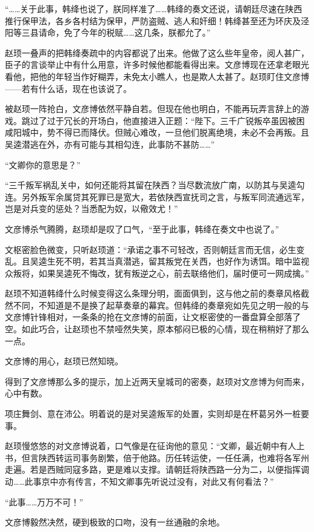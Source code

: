 “……关于此事，韩绛也说了，朕同样准了……韩绛的奏文还说，请朝廷尽速在陕西推行保甲法，各乡各村结为保甲，严防盗贼、逃人和奸细！韩绛甚至还为环庆及泾阳等三县请命，免了今年的税赋……这几条，朕都允了。”

赵顼一叠声的把韩绛奏疏中的内容都说了出来。他做了这么些年皇帝，阅人甚广，臣子的言谈举止中有什么用意，许多时候他都能看得出来。文彦博现在还拿老眼光看他，把他的年轻当作好糊弄，未免太小瞧人，也是欺人太甚了。赵顼盯住文彦博——若有什么话，现在也该说了。

被赵顼一阵抢白，文彦博依然平静自若。但现在他也明白，不能再玩弄言辞上的游戏。跳过了过于冗长的开场白，他直接进入正题：“陛下。三千广锐叛卒虽因被困咸阳城中，势不得已而降伏。但贼心难改，一旦他们脱离绝境，未必不会再叛。且吴逵潜逃在外，亦有可能与其相勾连，此事防不甚防……”

“文卿你的意思是？”

“三千叛军祸乱关中，如何还能将其留在陕西？当尽数流放广南，以防其与吴逵勾连。另外叛军余属贷其死罪已是宽大，若依陕西宣抚司之言，与叛军同流通远军，岂是对兵变的惩处？当悉配为奴，以儆效尤！”

文彦博杀气腾腾，赵顼却是叹了口气，“至于此事，韩绛在奏文中也说了。”

文枢密脸色微变，只听赵顼道：“承诺之事不可轻改，否则朝廷言而无信，必生变乱。且吴逵生死不明，若其当真潜逃，留其叛党在关西，也好作为诱饵。暗中监视众叛将，如果吴逵死不悔改，犹有叛逆之心，前去联络他们，届时便可一网成擒。”

赵顼不知道韩绛什么时候变得这么条理分明，面面俱到，这与他之前的奏章风格截然不同，不知道是不是换了起草奏章的幕宾。但韩绛的奏章宛如先见之明一般的与文彦博针锋相对，一条条的抢在文彦博的前面，让文枢密使的一番盘算全部落了空。如此巧合，让赵顼也不禁哑然失笑，原本郁闷已极的心情，现在稍稍好了那么一点。

文彦博的用心，赵顼已然知晓。

得到了文彦博那么多的提示，加上近两天皇城司的密奏，赵顼对文彦博为何而来，心中有数。

项庄舞剑、意在沛公。明着说的是对吴逵叛军的处置，实则却是在杯葛另外一桩要事。

赵顼慢悠悠的对文彦博说着，口气像是在征询他的意见：“文卿，最近朝中有人上书，但言陕西转运司事务剧繁，倍于他路。历任转运使，一任任满，也难将各军州走遍。若是西贼同寇多路，更是难以支撑。请朝廷将陕西路一分为二，以便指挥调动……此事京中亦有传言，不知文卿事先听说过没有，对此又有何看法？”

“此事……万万不可！”

文彦博毅然决然，硬到极致的口吻，没有一丝通融的余地。

